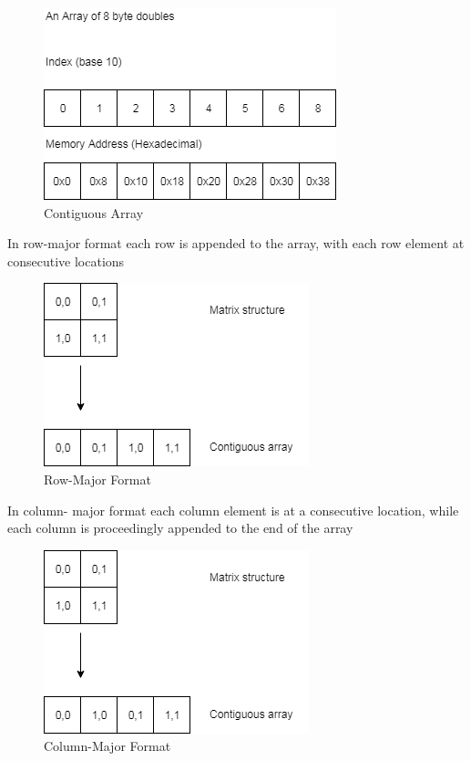 \documentclass[a4paper]{amsart}
\begin{document}
\begin{figure}[h]
\centering
\includegraphics[scale=0.5]{ContiguousArray1.png}
\caption {Contiguous Array}
\label {fig:cont}
\end{figure}

In row-major format each row is appended to the array, with each row element at consecutive locations

\begin{figure}[h]
\centering
\includegraphics[scale=0.5]{RowMajorFormat1.png}
\caption {Row-Major Format}
\label {fig:rowmajor}
\end{figure}


In column- major format each column element is at a consecutive location, while each column is proceedingly appended to the end of the array

\begin{figure}[h]
\centering
\includegraphics[scale=0.5]{ColumnMajorFormat1.png}
\caption {Column-Major Format}
\label {fig:colmajor}
\end{figure}
\end{document}
